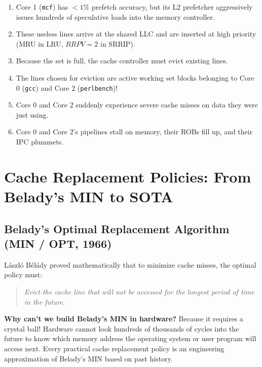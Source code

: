 \documentclass[11pt, a4paper]{article}
\begin{document}
\begin{defensebox}[title=\textbf{The Chain Reaction of Multicore Prefetch Pollution}]
\begin{enumerate}[leftmargin=1.2em]
  \item Core 1 (\texttt{mcf}) has $<1\%$ prefetch accuracy, but its L2 prefetcher aggressively issues hundreds of speculative loads into the memory controller.
  \item These useless lines arrive at the shared LLC and are inserted at high priority (MRU in LRU, $RRPV=2$ in SRRIP).
  \item Because the set is full, the cache controller must evict existing lines.
  \item The lines chosen for eviction are active working set blocks belonging to Core 0 (\texttt{gcc}) and Core 2 (\texttt{perlbench})!
  \item Core 0 and Core 2 suddenly experience severe cache misses on data they were just using.
  \item Core 0 and Core 2's pipelines stall on memory, their ROBs fill up, and their IPC plummets.
\end{enumerate}
\end{defensebox}

\newpage

\section{Cache Replacement Policies: From Belady's MIN to SOTA}

\subsection{Belady's Optimal Replacement Algorithm (MIN / OPT, 1966)}
László Bélády proved mathematically that to minimize cache misses, the optimal policy must:
\begin{quote}
\textit{Evict the cache line that will not be accessed for the longest period of time in the future.}
\end{quote}
\textbf{Why can't we build Belady's MIN in hardware?} Because it requires a crystal ball! Hardware cannot look hundreds of thousands of cycles into the future to know which memory address the operating system or user program will access next. Every practical cache replacement policy is an engineering approximation of Belady's MIN based on past history.
\end{document}
